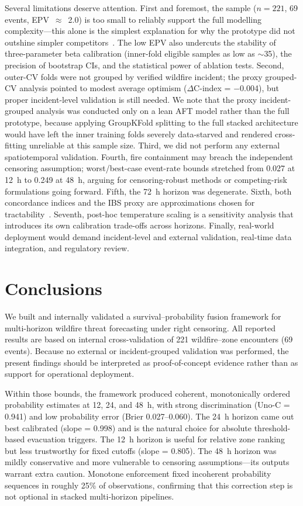 \documentclass[fire,article,submit,pdftex]{../Definitions/mdpi}
\begin{document}
Several limitations deserve attention.
First and foremost, the sample ($n = 221$, 69 events, EPV~$\approx$~2.0) is too small to reliably support the full modelling complexity---this alone is the simplest explanation for why the prototype did not outshine simpler competitors~\cite{Riley2020}.
The low EPV also undercuts the stability of three-parameter beta calibration (inner-fold eligible samples as low as $\sim$35), the precision of bootstrap CIs, and the statistical power of ablation tests.
Second, outer-CV folds were not grouped by verified wildfire incident; the proxy grouped-CV analysis pointed to modest average optimism ($\Delta$C-index = $-$0.004), but proper incident-level validation is still needed. We note that the proxy incident-grouped analysis was conducted only on a lean AFT model rather than the full prototype, because applying GroupKFold splitting to the full stacked architecture would have left the inner training folds severely data-starved and rendered cross-fitting unreliable at this sample size.
Third, we did not perform any external spatiotemporal validation.
Fourth, fire containment may breach the independent censoring assumption; worst/best-case event-rate bounds stretched from 0.027 at 12~h to 0.249 at 48~h, arguing for censoring-robust methods or competing-risk formulations going forward.
Fifth, the 72~h horizon was degenerate.
Sixth, both concordance indices and the IBS proxy are approximations chosen for tractability~\cite{Harrell1996,Uno2011,Graf1999}.
Seventh, post-hoc temperature scaling is a sensitivity analysis that introduces its own calibration trade-offs across horizons.
Finally, real-world deployment would demand incident-level and external validation, real-time data integration, and regulatory review.

\section{Conclusions}\label{sec:conclusions}

We built and internally validated a survival--probability fusion framework for multi-horizon wildfire threat forecasting under right censoring. All reported results are based on internal cross-validation of 221 wildfire--zone encounters (69 events). Because no external or incident-grouped validation was performed, the present findings should be interpreted as proof-of-concept evidence rather than as support for operational deployment.

Within those bounds, the framework produced coherent, monotonically ordered probability estimates at 12, 24, and 48~h, with strong discrimination (Uno-C = 0.941) and low probability error (Brier 0.027--0.060). The 24~h horizon came out best calibrated (slope = 0.998) and is the natural choice for absolute threshold-based evacuation triggers. The 12~h horizon is useful for relative zone ranking but less trustworthy for fixed cutoffs (slope = 0.805). The 48~h horizon was mildly conservative and more vulnerable to censoring assumptions---its outputs warrant extra caution. Monotone enforcement fixed incoherent probability sequences in roughly 25\% of observations, confirming that this correction step is not optional in stacked multi-horizon pipelines.
\end{document}
